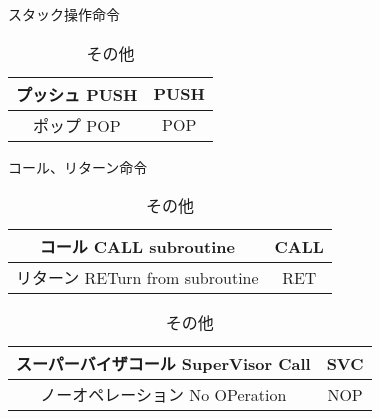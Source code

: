 \documentclass[a4j,uplatex]{jsarticle}
\numberwithin{equation}{section}
\begin{document}
	\begin{table}[htbp]
		\begin{minipage}[c]{0.5\hsize}
			\centering
			\caption{スタック操作命令}
			\begin{tabular}{|c|c|}
				\hline プッシュ PUSH & PUSH \\ \hline
				ポップ POP & POP \\ \hline
			\end{tabular}
		\end{minipage}
		\begin{minipage}[c]{0.5\hsize}
			\centering
			\caption{コール、リターン命令}
			\begin{tabular}{|c|c|}
				\hline コール CALL subroutine & CALL \\ \hline
				リターン RETurn from subroutine & RET \\ \hline
			\end{tabular}
		\end{minipage}
		\begin{minipage}[c]{0.5\hsize}
			\centering
			\caption{その他}
			\begin{tabular}{|c|c|}
				\hline スーパーバイザコール SuperVisor Call & SVC \\ \hline
				ノーオペレーション No OPeration & NOP \\ \hline
			\end{tabular}
		\end{minipage}
	\end{table}
	\begin{table}
		
	\end{table}
\end{document}
